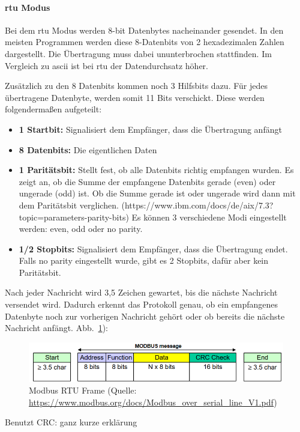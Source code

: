 \paragraph{\acs{rtu} Modus}
Bei dem \acs{rtu} Modus werden 8-bit Datenbytes nacheinander gesendet. In den meisten Programmen werden diese 8-Datenbits von 2 hexadezimalen Zahlen dargestellt. Die Übertragung muss dabei ununterbrochen stattfinden. Im Vergleich zu \acs{ascii} ist bei \acs{rtu} der Datendurchsatz höher. 

Zusätzlich zu den 8 Datenbits kommen noch 3 Hilfsbits dazu. Für jedes übertragene Datenbyte, werden somit 11 Bits verschickt. Diese werden folgendermaßen aufgeteilt:
\begin{itemize}
	\item \textbf{1 Startbit:} Signalisiert dem Empfänger, dass die Übertragung anfängt
	\item \textbf{8 Datenbits:} Die eigentlichen Daten
	\item \textbf{1 Paritätsbit:} Stellt fest, ob alle Datenbits richtig empfangen wurden. Es zeigt an, ob die Summe der empfangene Datenbits gerade (even) oder ungerade (odd) ist. Ob die Summe gerade ist oder ungerade wird dann mit dem Paritätsbit verglichen.   (https://www.ibm.com/docs/de/aix/7.3?topic=parameters-parity-bits) Es können 3 verschiedene Modi eingestellt werden: even, odd oder no parity.
	\item \textbf{1/2 Stopbits:} Signalisiert dem Empfänger, dass die Übertragung endet. Falls no parity eingestellt wurde, gibt es 2 Stopbits, dafür aber kein Paritätsbit.
\end{itemize}

Nach jeder Nachricht wird 3,5 Zeichen gewartet, bis die nächste Nachricht versendet wird. Dadurch erkennt das Protokoll genau, ob ein empfangenes Datenbyte noch zur vorherigen Nachricht gehört oder ob bereits die nächste Nachricht anfängt. 
Abb.~\ref{fig:modbus_frame}):
\begin{figure}[H]
	\centering
	\includegraphics[width=1.0\linewidth]{Bilder/Modbus_frame}
	\caption{Modbus RTU Frame (Quelle: \url{https://www.modbus.org/docs/Modbus_over_serial_line_V1.pdf})}
	\label{fig:modbus_frame}
\end{figure}

Benutzt CRC: ganz kurze erklärung

